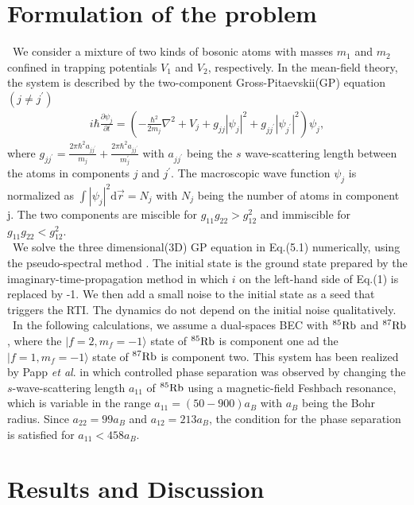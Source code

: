\documentclass[12pt,a4paper]{report}
\newcommand{\diff}{\mathrm{d}}				            %
\begin{document}
\section{Formulation of the problem}
\ We consider a mixture of two kinds of bosonic atoms with
masses $m_1$ and $m_2$ confined in trapping potentials $V_1$ and
$V_2$, respectively. In the mean-field theory, the system is described
by the two-component Gross-Pitaevskii(GP) equation $(j \neq j^\prime)$
\begin{eqnarray}
i \hbar \frac{\partial \psi_j}{\partial t} =
\left(
- \frac{\hbar^2}{2m_j} \nabla^2 + V_j + g_{jj} |\psi_j|^2 + g_{jj^\prime} |\psi_{j^\prime}|^2
\right) \psi_j,
\end{eqnarray}
where $\displaystyle g_{jj^\prime} = \frac{2 \pi \hbar^2 a_{jj^\prime}}{m_j}
+\frac{2 \pi \hbar^2 a_{jj^\prime}}{m_j^\prime}$ with $a_{jj^\prime}$ being the
$s$ wave-scattering length between the atoms in components $j$ and $j^\prime$.
The macroscopic wave function $\psi_j$ is normalized as $\int |\psi_j|^2 \diff \vec{r} = N_j$
with $N_j$ being the number of atoms in component j. The two components are miscible for 
$g_{11}g_{22} > g_{12}^2$ and immiscible for $g_{11}g_{22} < g_{12}^2$.
\\
\ We solve the three dimensional(3D) GP equation in Eq.(5.1)
numerically, using the pseudo-spectral method \cite{34}. The initial
state is the ground state prepared by the imaginary-time-propagation method
in which $i$ on the left-hand side of Eq.(1) is replaced by -1. We then add a small noise to
the initial state as a seed that triggers the RTI. The dynamics do not 
depend on the initial noise qualitatively.
\\
\ In the following calculations, we assume a dual-spaces 
BEC with $^{85} {\rm Rb}$ and $^{87} {\rm Rb}$, where the $|f=2, m_f = -1 \rangle$ state
of $^{85} {\rm Rb}$ is component one ad the $|f=1, m_f=-1 \rangle$ state
of $^{87} {\rm Rb}$ is component two. This system has been realized
by Papp {\it et al}.\cite{72} in which controlled phase separation
was observed by changing the $s$-wave-scattering length $a_{11}$
of $^{85} {\rm Rb}$ using a magnetic-field Feshbach resonance, which is
variable in the range $a_{11}=(50-900)a_B$ with $a_B$ being the Bohr
radius. Since $a_{22} = 99 a_B$ and $a_{12}=213a_B$, the condition for
the phase separation is satisfied for $a_{11} < 458 a_B$.


\section{Results and Discussion}
\end{document}
